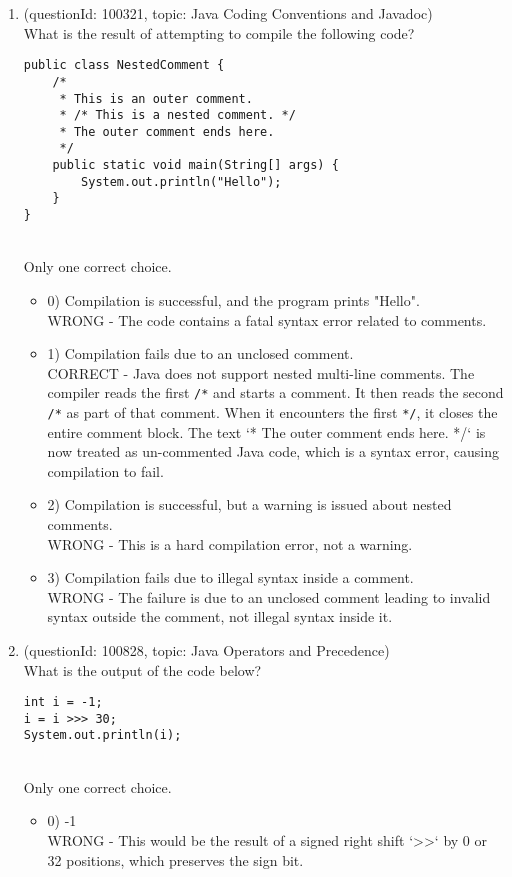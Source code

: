 \documentclass[12pt]{article}
\begin{document}
\begin{enumerate}[label=(\arabic*)]
\begin{itemize}
\end{itemize}
\item (questionId: 100321, topic: Java Coding Conventions and Javadoc) \\ 
What is the result of attempting to compile the following code?
\begin{verbatim}
public class NestedComment {
    /*
     * This is an outer comment.
     * /* This is a nested comment. */
     * The outer comment ends here.
     */
    public static void main(String[] args) {
        System.out.println("Hello");
    }
}
\end{verbatim}
\\ \noindent Only one correct choice. 
\begin{itemize}
\item 0) Compilation is successful, and the program prints "Hello".
 \\ 
WRONG - The code contains a fatal syntax error related to comments.

\item 1) Compilation fails due to an unclosed comment.
 \\ 
CORRECT - Java does not support nested multi-line comments. The compiler reads the first \verb|/*| and starts a comment. It then reads the second \verb|/*| as part of that comment. When it encounters the first \verb|*/|, it closes the entire comment block. The text `* The outer comment ends here. */` is now treated as un-commented Java code, which is a syntax error, causing compilation to fail.

\item 2) Compilation is successful, but a warning is issued about nested comments.
 \\ 
WRONG - This is a hard compilation error, not a warning.

\item 3) Compilation fails due to illegal syntax inside a comment.
 \\ 
WRONG - The failure is due to an unclosed comment leading to invalid syntax outside the comment, not illegal syntax inside it.

\end{itemize}
\item (questionId: 100828, topic: Java Operators and Precedence) \\ 
What is the output of the code below?\n\begin{verbatim}
int i = -1;
i = i >>> 30;
System.out.println(i);
\end{verbatim}
\\ \noindent Only one correct choice. 
\begin{itemize}
\item 0) -1
 \\ 
WRONG - This would be the result of a signed right shift `>>` by 0 or 32 positions, which preserves the sign bit.


\end{itemize}
\end{enumerate}
\end{document}
